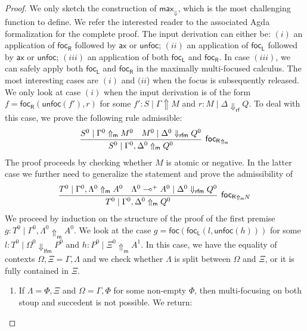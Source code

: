 \documentclass[runningheads]{llncs}
\newcommand{\ax}{\mathsf{ax}}
\newcommand{\lolli}{\multimap}
\newcommand{\lfm}{\dn_\mathsf{lfm}}%
\newcommand{\rfm}{\dn_\mathsf{rfm}}%
\newcommand{\rf}{\dn_\mathsf{rf}}%
\newcommand{\proofbox}[1]{\begin{tabular}{l} #1 \end{tabular}}
\newcommand{\green}[1]{{#1^0}}
\newcommand{\up}{\Uparrow}
\newcommand{\dn}{\Downarrow}
\newcommand{\upm}{\Uparrow_{\mathsf{m}}}
\newcommand{\focL}{\mathsf{foc_L}}
\newcommand{\foc}{\mathsf{foc}}
\newcommand{\focR}{\mathsf{foc_R}}
\newcommand{\unfoc}{\mathsf{unfoc}}
\begin{document}
\begin{proof}
  We only sketch the construction of $\mathsf{max}_\dn$, which is the most challenging function to define. We refer the interested reader to the associated Agda formalization for the complete proof. The input derivation can either be: $(i)$ an application of $\focR$ followed by $\ax$ or $\unfoc$; $(ii)$ an application of $\focL$ followed by $\ax$ or $\unfoc$; $(iii)$ an application of both $\focL$ and $\focR$. In case $(iii)$, we can safely apply both $\focL$ and $\focR$ in the maximally multi-focused calculus. The most interesting cases are $(i)$ and $(ii$) when the focus is subsequently released. We only look at case $(i)$ when the input derivation is of the form $f = \focR(\unfoc(f'),r)$ for some $f' : S \mid \Gamma \up M$ and $r : M \mid \Delta \rf Q$. To deal with this case, we prove the following rule admissible:%
  \begin{equation*}\label{eq:otmax}
    \proofbox{
    \infer[\focR_{\upm}]{\green{S} \mid \green{\Gamma},\green{\Delta} \upm \green{Q}}{
      \green{S} \mid \green{\Gamma} \upm \green{M}
      &
      \green{M} \mid \green{\Delta} \rfm \green{Q}
    }
    }
  \end{equation*}
  The proof proceeds by checking whether $M$ is atomic or negative. In the latter case we further need to generalize the statement and prove the admissibility of
  \begin{equation*}\label{eq:otmaxneg}
    \proofbox{
    \infer[\focR_{\upm N}]{\green{T} \mid \green{\Gamma},\green{\Delta} \upm \green{Q}}{
      \green{T} \mid \green{\Gamma},\green{\Lambda} \upm \green{A}
      &
      \green{\green{\Lambda} \lolli^+ A} \mid \green{\Delta} \rfm \green{Q}
    }
    }
  \end{equation*}
  We proceed by induction on the structure of the proof of the first premise ${g : \green{T} \mid \green{\Gamma},\green{\Lambda} \upm \green{A}}$. We look at the case $g = \foc(\focL(l,\unfoc(h)))$ for some $l : \green{T} \mid \green{\Omega} \lfm \green{P}$ and $h : \green{P} \mid \green{\Xi} \upm A^1$. In this case, we have the equality of contexts $\Omega,\Xi = \Gamma,\Lambda$ and we check whether $\Lambda$ is split between $\Omega$ and $\Xi$, or it is fully contained in $\Xi$.
  \begin{enumerate}
  \item If $\Lambda = \Phi,\Xi$ and $\Omega =\Gamma,\Phi$ for some non-empty $\Phi$, then multi-focusing on both stoup and succedent is not possible. We return:

\end{enumerate}
\end{proof}
\end{document}
